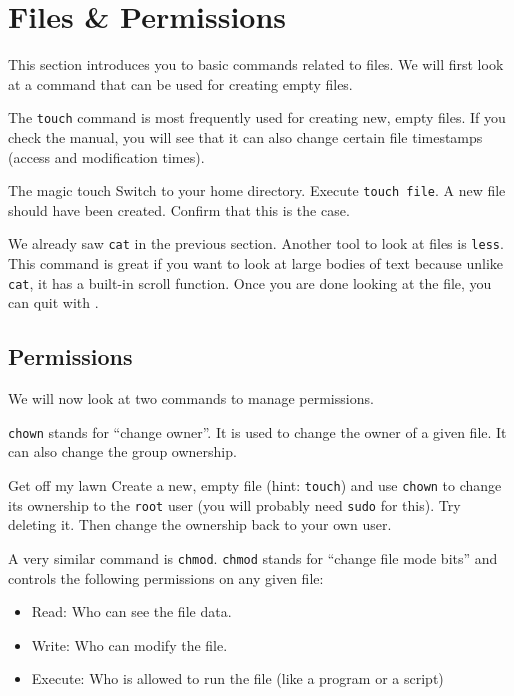 \documentclass{TheAlternativeCourse}
\begin{document}
\section{Files \& Permissions}

This section introduces you to basic commands related to files. We will first
look at a command that can be used for creating empty files.

The \texttt{touch} command is most frequently used for creating new, empty
files. If you check the manual, you will see that it can also change certain
file timestamps (access and modification times).

\begin{exercisebox}{The magic touch}
    Switch to your home directory. Execute \texttt{touch file}. A new file
    should have been created. Confirm that this is the case.
\end{exercisebox}
%
We already saw \texttt{cat} in the previous section. Another tool to look at
files is \texttt{less}. This command is great if you want to look at large
bodies of text because unlike \texttt{cat}, it has a built-in scroll function.
Once you are done looking at the file, you can quit with .

\subsection{Permissions}

We will now look at two commands to manage permissions.

\texttt{chown} stands for ``change owner''. It is used to change the owner of a
given file. It can also change the group ownership.

\begin{exercisebox}{Get off my lawn}
    Create a new, empty file (hint: \texttt{touch}) and use \texttt{chown} to
    change its ownership to the \texttt{root} user (you will probably need
    \texttt{sudo} for this). Try deleting it. Then change the ownership back to
    your own user.
\end{exercisebox}
%
A very similar command is \texttt{chmod}. \texttt{chmod} stands for ``change
file mode bits'' and controls the following permissions on any given file:

\begin{itemize}
    \setlength\itemsep{-9pt}
	\item Read: Who can see the file data.
	\item Write: Who can modify the file.
	\item Execute: Who is allowed to run the file (like a program or a script)
\end{itemize}
\end{document}
